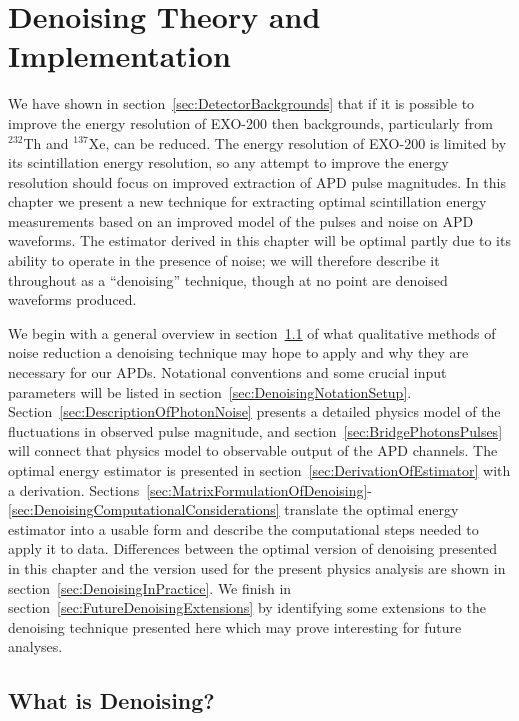 \renewcommand{\thechapter}{4}
\chapter{Denoising Theory and Implementation}
\label{ch:DenoisingTheory}

We have shown in section~\ref{sec:DetectorBackgrounds} that if it is possible to improve the energy resolution of EXO-200 then backgrounds, particularly from $^{232}$Th and $^{137}$Xe, can be reduced.  The energy resolution of EXO-200 is limited by its scintillation energy resolution, so any attempt to improve the energy resolution should focus on improved extraction of APD pulse magnitudes.  In this chapter we present a new technique for extracting optimal scintillation energy measurements based on an improved model of the pulses and noise on APD waveforms.  The estimator derived in this chapter will be optimal partly due to its ability to operate in the presence of noise; we will therefore describe it throughout as a ``denoising'' technique, though at no point are denoised waveforms produced.

We begin with a general overview in section~\ref{sec:WhatIsDenoising} of what qualitative methods of noise reduction a denoising technique may hope to apply and why they are necessary for our APDs.  Notational conventions and some crucial input parameters will be listed in section~\ref{sec:DenoisingNotationSetup}.  Section~\ref{sec:DescriptionOfPhotonNoise} presents a detailed physics model of the fluctuations in observed pulse magnitude, and section~\ref{sec:BridgePhotonsPulses} will connect that physics model to observable output of the APD channels.  The optimal energy estimator is presented in section~\ref{sec:DerivationOfEstimator} with a derivation.  Sections~\ref{sec:MatrixFormulationOfDenoising}-\ref{sec:DenoisingComputationalConsiderations} translate the optimal energy estimator into a usable form and describe the computational steps needed to apply it to data.  Differences between the optimal version of denoising presented in this chapter and the version used for the present physics analysis are shown in section~\ref{sec:DenoisingInPractice}.  We finish in section~\ref{sec:FutureDenoisingExtensions} by identifying some extensions to the denoising technique presented here which may prove interesting for future analyses.

\section{What is Denoising?}\label{sec:WhatIsDenoising}

